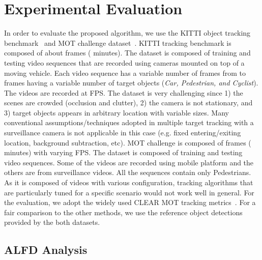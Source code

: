 \documentclass[10pt,twocolumn,letterpaper]{article}
\begin{document}
\section{Experimental Evaluation}
\label{sec:exp}
In order to evaluate the proposed algorithm, we use the KITTI object tracking benchmark~\cite{Geiger2012CVPR} and MOT challenge dataset~\cite{MOTChallenge}.
KITTI tracking benchmark is composed of about  frames ( minutes). The dataset is composed of  training and  testing video sequences that are recorded using cameras mounted on top of a moving vehicle. Each video sequence has a variable number of frames from  to  frames having a variable number of target objects (\emph{Car, Pedestrian, and Cyclist}). The videos are recorded at  FPS. The dataset is very challenging since 1) the scenes are crowded (occlusion and clutter), 2) the camera is not stationary, and 3) target objects appears in arbitrary location with variable sizes. Many conventional assumptions/techniques adopted in multiple target tracking with a surveillance camera is not applicable in this case (e.g. fixed entering/exiting location, background subtraction, etc).
MOT challenge is composed of  frames ( minutes) with varying FPS. The dataset is composed of  training and  testing video sequences. Some of the videos are recorded using mobile platform and the others are from surveillance videos. All the sequences contain only Pedestrians. As it is composed of videos with various configuration, tracking algorithms that are particularly tuned for a specific scenario would not work well in general.   
For the evaluation, we adopt the widely used CLEAR MOT tracking metrics~\cite{keni2008evaluating}. For a fair comparison to the other methods, we use the reference object detections provided by the both datasets. 

\subsection{ALFD Analysis}
\label{sec:exp:alfd}
\end{document}
